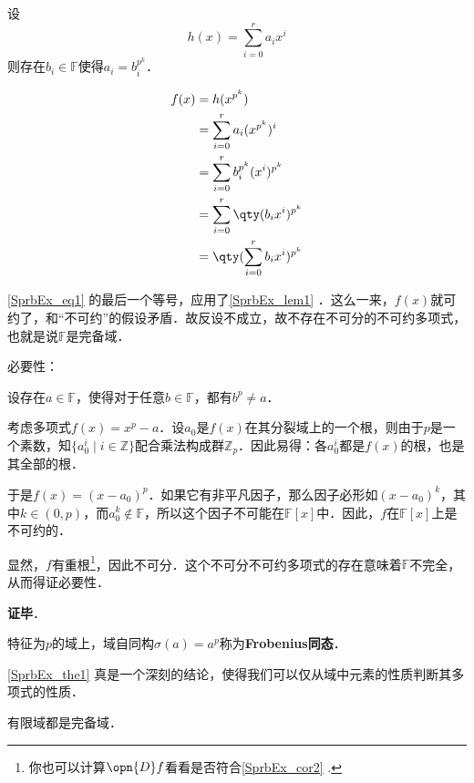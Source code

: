 设
\begin{equation}
h(x) = \sum_{i=0}^r a_ix^i
\end{equation}
则存在$b_i\in\mathbb{F}$使得$a_i=b_i^{p^k}$．

\begin{equation}\label{SprbEx_eq1}
\begin{aligned}
f(x)&=h(x^{p^k}) \\
&=\sum_{i=0}^r a_i(x^{p^k})^i\\
&=\sum_{i=0}^r b_i^{p^k}(x^{i})^{p^k}\\
&=\sum_{i=0}^r \qty(b_ix^i)^{p^k}\\
&=\qty(\sum_{i=0}^r b_ix^i)^{p^k}
\end{aligned}
\end{equation}

\autoref{SprbEx_eq1} 的最后一个等号，应用了\autoref{SprbEx_lem1} ．这么一来，$f(x)$就可约了，和“不可约”的假设矛盾．故反设不成立，故不存在不可分的不可约多项式，也就是说$\mathbb{F}$是完备域．

必要性：

设存在$a\in\mathbb{F}$，使得对于任意$b\in\mathbb{F}$，都有$b^p\neq a$．

考虑多项式$f(x) = x^p-a$．设$a_0$是$f(x)$在其分裂域上的一个根，则由于$p$是一个素数，知$\{a_0^i\mid i\in\mathbb{Z}\}$配合乘法构成群$\mathbb{Z}_p$．因此易得：各$a_0^i$都是$f(x)$的根，也是其全部的根．

于是$f(x)=(x-a_0)^p$．如果它有非平凡因子，那么因子必形如$(x-a_0)^k$，其中$k\in(0, p)$，而$a_0^k\not\in\mathbb{F}$，所以这个因子不可能在$\mathbb{F}[x]$中．因此，$f$在$\mathbb{F}[x]$上是不可约的．

显然，$f$有重根\footnote{你也可以计算$\opn{D}f$看看是否符合\autoref{SprbEx_cor2} .}，因此不可分．这个不可分不可约多项式的存在意味着$\mathbb{F}$不完全，从而得证必要性．

\textbf{证毕}．




特征为$p$的域上，域自同构$\sigma(a)=a^p$称为\textbf{Frobenius同态}．


\autoref{SprbEx_the1} 真是一个深刻的结论，使得我们可以仅从域中元素的性质判断其多项式的性质．









\begin{corollary}{}\label{SprbEx_cor4}
有限域都是完备域．
\end{corollary}

